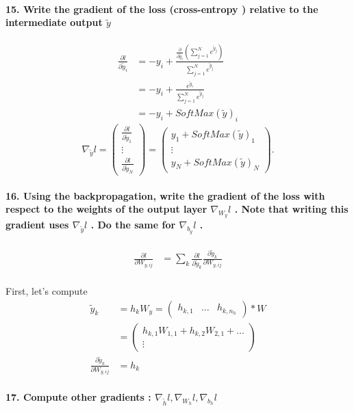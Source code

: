 \documentclass{article}
\theoremstyle{plain}%
\theoremstyle{definition}
\theoremstyle{remark}
\begin{document}
\paragraph{15. Write the gradient of the loss (cross-entropy ) relative to the intermediate output $ \tilde{y} $ }
\begin{align*}
    \frac{\partial l}{\partial \tilde{y}_i} &= -y_i + \frac{\frac{\partial }{\partial \tilde{y}_i } (\sum_{j=1}^{N} e^{ \tilde{y}_j })}{\sum_{j=1}^{N} e^{ \tilde{y}_j }} \\
        &= - y_i + \frac{e^{\tilde{y}_i}}{\sum_{j=1}^{N} e^{ \tilde{y}_j}} \\
        &= - y_i + SoftMax(\tilde{y})_i
\end{align*}
\[
    \nabla _{\tilde{y}}l = \begin{pmatrix}
        \frac{\partial l}{\partial \tilde{y}_1} \\
        \vdots \\
        \frac{\partial l}{\partial \tilde{y}_N}
    \end{pmatrix} = \begin{pmatrix}
        y_1 + SoftMax(\tilde{y})_1 \\
        \vdots \\
        y_N + SoftMax(\tilde{y})_N
    \end{pmatrix}
.\]


\paragraph{16. Using the backpropagation, write the gradient of the loss with respect to the weights of the output layer $ \nabla _{W_y}l $ . Note that writing this gradient uses $ \nabla _{\tilde{y}}l $ . Do the same for $ \nabla _{b_y}l $ .}
\begin{align*}
    \frac{\partial l}{\partial W_{y,ij}} &= \sum_{k}^{} \frac{\partial l}{\partial \tilde{y}_k} \frac{\partial \tilde{y}_k}{\partial W_{y,ij}} \\
\end{align*}

First, let's compute 
\begin{align*}
    \tilde{y}_k &= h_k W_y = \begin{pmatrix}
        h_{k,1} & \dots & h_{k,n_h}
    \end{pmatrix} * W \\
        &= \begin{pmatrix}
            h_{k,1} W_{1,1} + h_{k, 2} W_{2, 1} + \dots \\
            \vdots 
        \end{pmatrix} \\
    
    \frac{\partial \tilde{y}_k}{\partial W_{y,ij}} &= h_{k}
        
    
    
\end{align*}

\paragraph{17. Compute other gradients : $ \nabla _{\tilde{h}} l, \nabla _{W_h} l, \nabla_{b_h}l $ }
\end{document}
